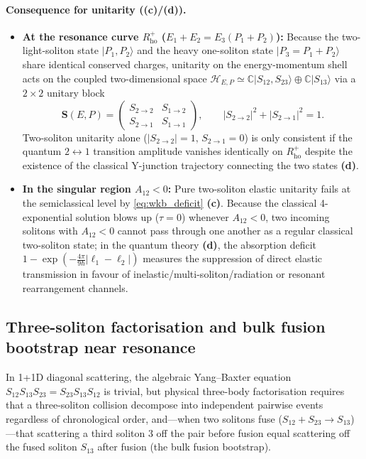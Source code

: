 \documentclass[11pt,a4paper]{article}
\newcommand{\Lc}{\textsf{\textbf{(c)}}\xspace}
\newcommand{\Ld}{\textsf{\textbf{(d)}}\xspace}
\newcommand{\hb}{\hbar}
\theoremstyle{remark}
\begin{document}
\paragraph{Consequence for unitarity (\Lc/\Ld).}
\begin{itemize}
\item \textbf{At the resonance curve $R_{\mathrm{ho}}^+$ ($E_1+E_2=E_3(P_1+P_2)$):}
Because the two-light-soliton state $|P_1,P_2\rangle$ and the heavy one-soliton
state $|P_3=P_1+P_2\rangle$ share identical conserved charges, unitarity on the
energy-momentum shell acts on the coupled two-dimensional space
$\mathcal{H}_{E,P} \simeq \mathbb{C}|S_{12},S_{23}\rangle \oplus \mathbb{C}|S_{13}\rangle$ via a
$2\times 2$ unitary block
\begin{equation}\label{eq:coupled_S}
  \mathbf{S}(E,P) = \begin{pmatrix} S_{2\to 2} & S_{1\to 2} \\ S_{2\to 1} & S_{1\to 1} \end{pmatrix}, \qquad
  |S_{2\to 2}|^2 + |S_{2\to 1}|^2 = 1.
\end{equation}
Two-soliton unitarity alone ($|S_{2\to 2}|=1,\,S_{2\to 1}=0$) is only consistent
if the quantum $2\leftrightarrow 1$ transition amplitude vanishes identically on
$R_{\mathrm{ho}}^+$ despite the existence of the classical Y-junction trajectory
connecting the two states \Ld.
\item \textbf{In the singular region $A_{12}<0$:}
Pure two-soliton elastic unitarity fails at the semiclassical level by
\eqref{eq:wkb_deficit} \Lc. Because the classical 4-exponential solution blows up
($\tau=0$) whenever $A_{12}<0$, two incoming solitons with $A_{12}<0$ cannot pass
through one another as a regular classical two-soliton state; in the quantum
theory \Ld, the absorption deficit $1 - \exp(-\frac{4\pi}{9\hb}|\ell_1-\ell_2|)$
measures the suppression of direct elastic transmission in favour of
inelastic/multi-soliton/radiation or resonant rearrangement channels.
\end{itemize}

\subsection{Three-soliton factorisation and bulk fusion bootstrap near resonance}

In 1+1D diagonal scattering, the algebraic Yang--Baxter equation
$S_{12}S_{13}S_{23} = S_{23}S_{13}S_{12}$ is trivial, but physical
three-body factorisation requires that a three-soliton collision decompose into
independent pairwise events regardless of chronological order, and---when two
solitons fuse ($S_{12}+S_{23}\to S_{13}$)—that scattering a third soliton $3$
off the pair before fusion equal scattering off the fused soliton $S_{13}$ after
fusion (the bulk fusion bootstrap).
\end{document}
